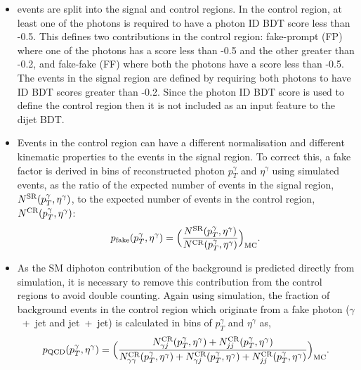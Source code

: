 \begin{itemize}
    \item events are split into the signal and control regions. In the control region, at least one of the photons is required to have a photon ID BDT score less than -0.5. This defines two contributions in the control region: fake-prompt (FP) where one of the photons has a score less than -0.5 and the other greater than -0.2, and fake-fake (FF) where both the photons have a score less than -0.5. The events in the signal region are defined by requiring both photons to have ID BDT scores greater than -0.2. Since the photon ID BDT score is used to define the control region then it is not included as an input feature to the dijet BDT.
    
    \item Events in the control region can have a different normalisation and different kinematic properties to the events in the signal region. To correct this, a fake factor is derived in bins of reconstructed photon $p_T^\gamma$ and $\eta^\gamma$ using simulated events, as the ratio of the expected number of events in the signal region, $N^{\rm{SR}}(p_T^\gamma,\eta^\gamma)$, to the expected number of events in the control region, $N^{\rm{CR}}(p_T^\gamma,\eta^\gamma)$:
    \begin{equation}
        p_{\rm{fake}}(p_T^\gamma,\eta^\gamma) = \Big(\frac{N^{\rm{SR}}(p_T^\gamma,\eta^\gamma)}{N^{\rm{CR}}(p_T^\gamma,\eta^\gamma)}\Big)_{\rm{MC}}.
    \end{equation}
    
    \item As the SM diphoton contribution of the background is predicted directly from simulation, it is necessary to remove this contribution from the control regions to avoid double counting. Again using simulation, the fraction of background events in the control region which originate from a fake photon ($\gamma$~+~jet and jet~+~jet) is calculated in bins of $p_T^{\gamma}$ and $\eta^\gamma$ as,
    \begin{equation}
        p_{\rm{QCD}}(p_T^\gamma,\eta^\gamma) = \Big(\frac{N_{\gamma j}^{\rm{CR}}(p_T^\gamma,\eta^\gamma)+N_{jj}^{\rm{CR}}(p_T^\gamma,\eta^\gamma)}{N_{\gamma\gamma}^{\rm{CR}}(p_T^\gamma,\eta^\gamma)+N_{\gamma j}^{\rm{CR}}(p_T^\gamma,\eta^\gamma)+N_{jj}^{\rm{CR}}(p_T^\gamma,\eta^\gamma)}\Big)_{\rm{MC}}.
    \end{equation}    
    

\end{itemize}
